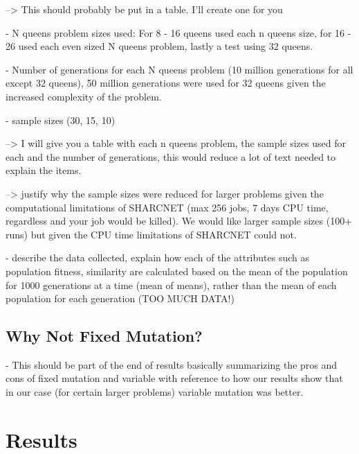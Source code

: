 \documentclass{sig-alternate}
\begin{document}
  --> This should probably be put in a table. I'll create one for you


- N queens problem sizes used: For 8 - 16 queens used each n queens size, for
  16 - 26 used each even sized N queens problem, lastly a test using 32 queens.

- Number of generations for each N queens problem (10 million generations for
  all except 32 queens), 50 million generations were used for 32 queens given
  the increased complexity of the problem.

- sample sizes (30, 15, 10)

    --> I will give you a table with each n queens problem, the sample sizes used 
        for each and the number of generations, this would reduce a lot of text
        needed to explain the items.

    --> justify why the sample sizes were reduced for larger problems given the 
        computational limitations of SHARCNET (max 256 jobs, 7 days CPU time, 
        regardless and your job would be killed). We would like larger sample sizes
        (100+ runs) but given the CPU time limitations of SHARCNET could not.

- describe the data collected, explain how each of the attributes such as
  population fitness, similarity are calculated based on the mean of the population
  for 1000 generations at a time (mean of means), rather than the mean of each
  population for each generation (TOO MUCH DATA!)



\subsection{Why Not Fixed Mutation?}

- This should be part of the end of results basically summarizing the pros
  and cons of fixed mutation and variable with reference to how our results
  show that in our case (for certain larger problems) variable mutation was better.




% 
%
\section{Results}
\end{document}
